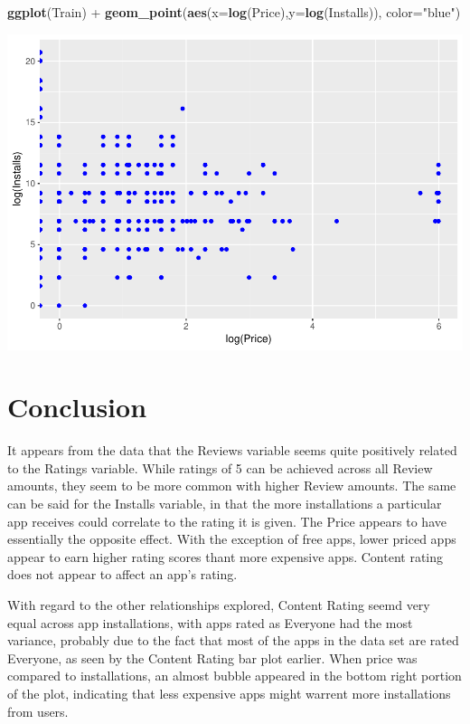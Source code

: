 \documentclass[]{article}
\newenvironment{Shaded}{\begin{snugshade}}{\end{snugshade}}
\newcommand{\KeywordTok}[1]{\textcolor[rgb]{0.13,0.29,0.53}{\textbf{{#1}}}}
\newcommand{\DataTypeTok}[1]{\textcolor[rgb]{0.13,0.29,0.53}{{#1}}}
\newcommand{\StringTok}[1]{\textcolor[rgb]{0.31,0.60,0.02}{{#1}}}
\newcommand{\NormalTok}[1]{{#1}}
\begin{document}
\begin{Shaded}
\begin{Highlighting}[]
\KeywordTok{ggplot}\NormalTok{(Train) +}\StringTok{ }\KeywordTok{geom_point}\NormalTok{(}\KeywordTok{aes}\NormalTok{(}\DataTypeTok{x=}\KeywordTok{log}\NormalTok{(Price),}\DataTypeTok{y=}\KeywordTok{log}\NormalTok{(Installs)), }\DataTypeTok{color=}\StringTok{"blue"}\NormalTok{)}
\end{Highlighting}
\end{Shaded}

\includegraphics{Project_2_Work_files/figure-latex/unnamed-chunk-17-2.pdf}

\section{Conclusion}\label{conclusion}

It appears from the data that the Reviews variable seems quite
positively related to the Ratings variable. While ratings of 5 can be
achieved across all Review amounts, they seem to be more common with
higher Review amounts. The same can be said for the Installs variable,
in that the more installations a particular app receives could correlate
to the rating it is given. The Price appears to have essentially the
opposite effect. With the exception of free apps, lower priced apps
appear to earn higher rating scores thant more expensive apps. Content
rating does not appear to affect an app's rating.

With regard to the other relationships explored, Content Rating seemd
very equal across app installations, with apps rated as Everyone had the
most variance, probably due to the fact that most of the apps in the
data set are rated Everyone, as seen by the Content Rating bar plot
earlier. When price was compared to installations, an almost bubble
appeared in the bottom right portion of the plot, indicating that less
expensive apps might warrent more installations from users.
\end{document}
